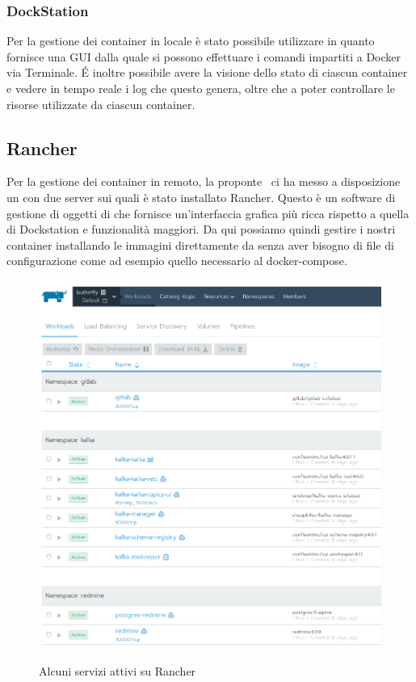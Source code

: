         \subsubsection{DockStation}
        Per la gestione dei container in locale è stato possibile utilizzare  in quanto fornisce una GUI dalla quale si possono effettuare i comandi impartiti a Docker via Terminale.
        \'E inoltre possibile avere la visione dello stato di ciascun container e vedere in tempo reale i log che questo genera, oltre che a poter controllare le risorse utilizzate da ciascun container.
        
        \subsection{Rancher}
    	Per la gestione dei container in remoto, la proponte \II~ci ha messo a disposizione un  con due server sui quali è stato installato Rancher. Questo è un software di gestione di oggetti di  che fornisce un'interfaccia grafica più ricca rispetto a quella di Dockstation e funzionalità maggiori.
    	Da qui possiamo quindi gestire i nostri container installando le immagini direttamente da  senza aver bisogno di file di configurazione come ad esempio quello necessario al docker-compose.
    	
    	\begin{figure}[H]
    		\centering
    		\includegraphics[width=.7\textwidth]{img/rancher.png}\\
    		\caption{Alcuni servizi attivi su Rancher}
    		\label{fig:rancher}
    	\end{figure}
        
			